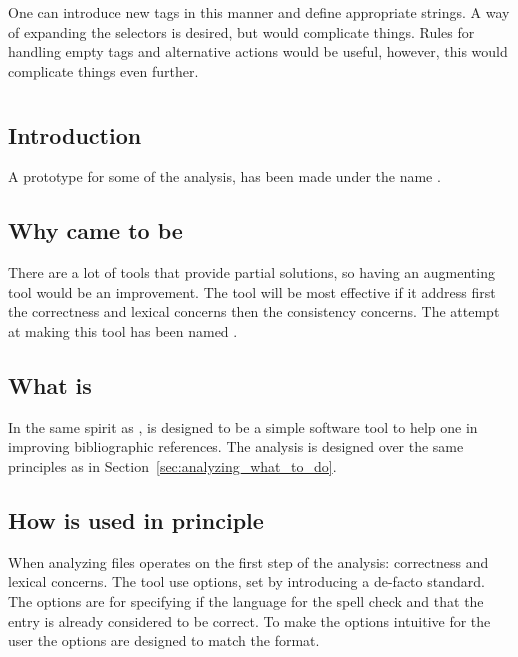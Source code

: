 One can introduce new tags in this manner and define appropriate
strings.  A way of expanding the selectors is desired, but would
complicate things.  Rules for handling empty tags and alternative
actions would be useful, however, this would complicate things even
further.


\section{{\orangutan}}
\label{sec:analyzing_orangutan}
\subsection{Introduction}

A prototype for some of the analysis, has been made under the name
{\orangutan}.



\subsection{Why {\orangutan} came to be}

There are a lot of tools that provide partial solutions, so having an
augmenting tool would be an improvement.  The tool will be most
effective if it address first the correctness and lexical concerns
then the consistency concerns.  The attempt at making this tool has
been named \newdef{\orangutan}.


\subsection{What is {\orangutan}}

In the same spirit as {\bibtex}, {\orangutan} is designed to be a
simple software tool to help one in improving bibliographic
references.  The analysis is designed over the same principles as in
Section~\ref{sec:analyzing_what_to_do}.


\subsection{How {\orangutan} is used in principle}

When analyzing {\bibtex} files {\orangutan} operates on the first step
of the analysis: correctness and lexical concerns.  The tool use
options, set by introducing a de-facto standard.  The options are for
specifying if the language for the spell check and that the entry is
already considered to be correct.  To make the options intuitive for
the {\bibtex} user the options are designed to match the {\bibtex}
format.


